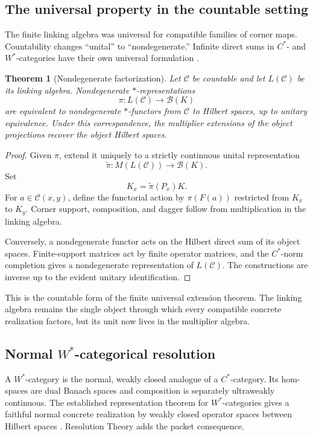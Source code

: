 \documentclass[11pt]{article}
\newtheorem{theorem}{Theorem}[section]
\theoremstyle{definition}
\theoremstyle{remark}
\begin{document}
\subsection{The universal property in the countable setting}

The finite linking algebra was universal for compatible families of corner maps.  Countability changes ``unital'' to ``nondegenerate.''  Infinite direct sums in $C^*$- and $W^*$-categories have their own universal formulation \cite{FritzWesterbaan2020}.

\begin{theorem}[Nondegenerate factorization]
Let $\mathcal C$ be countable and let $L(\mathcal C)$ be its linking algebra.  Nondegenerate $*$-representations
\[
\pi:L(\mathcal C)\to\mathcal B(K)
\]
are equivalent to nondegenerate $*$-functors from $\mathcal C$ to Hilbert spaces, up to unitary equivalence.  Under this correspondence, the multiplier extensions of the object projections recover the object Hilbert spaces.
\end{theorem}

\begin{proof}
Given $\pi$, extend it uniquely to a strictly continuous unital representation
\[
\widetilde\pi:M(L(\mathcal C))\to\mathcal B(K).
\]
Set
\[
K_x=\widetilde\pi(P_x)K.
\]
For $a\in\mathcal C(x,y)$, define the functorial action by $\pi(F(a))$ restricted from $K_x$ to $K_y$.  Corner support, composition, and dagger follow from multiplication in the linking algebra.

Conversely, a nondegenerate functor acts on the Hilbert direct sum of its object spaces.  Finite-support matrices act by finite operator matrices, and the $C^*$-norm completion gives a nondegenerate representation of $L(\mathcal C)$.  The constructions are inverse up to the evident unitary identification.
\end{proof}

This is the countable form of the finite universal extension theorem.  The linking algebra remains the single object through which every compatible concrete realization factors, but its unit now lives in the multiplier algebra.

\subsection{Normal $W^*$-categorical resolution}

A $W^*$-category is the normal, weakly closed analogue of a $C^*$-category.  Its hom-spaces are dual Banach spaces and composition is separately ultraweakly continuous.  The established representation theorem for $W^*$-categories gives a faithful normal concrete realization by weakly closed operator spaces between Hilbert spaces \cite{GLR1985}.  Resolution Theory adds the packet consequence.
\end{document}
